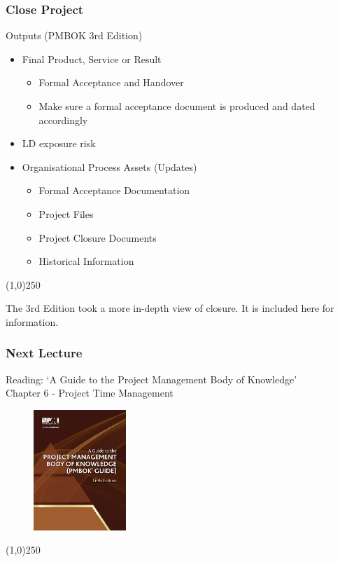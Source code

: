 \begin{frame}
\frametitle{Close Project}
Outputs (PMBOK 3rd Edition)
\begin{itemize}
	\item Final Product, Service or Result
		\begin{itemize}
			\item Formal Acceptance and Handover
			\item Make sure a formal acceptance document is produced and dated accordingly
		\end{itemize}
	\item LD exposure risk
	\item Organisational Process Assets (Updates)
		\begin{itemize}
			\item Formal Acceptance Documentation
			\item Project Files
			\item Project Closure Documents
			\item Historical Information
		\end{itemize}
\end{itemize}
\end{frame}\begin{center}\line(1,0){250}\end{center}


The 3rd Edition took a more in-depth view of closure.  It is included here for information. 

%
%

\begin{frame}
\frametitle{Next Lecture}{Reading:}
`A Guide to the Project Management Body of Knowledge'\\ 
Chapter 6 - Project Time Management
\begin{figure}[h]
	\centering
		\includegraphics[width = 3.5cm]{images/book.jpg}
\end{figure}
\end{frame}\begin{center}\line(1,0){250}\end{center}







